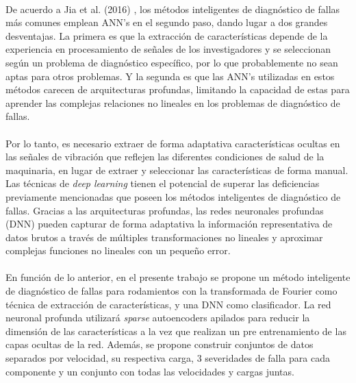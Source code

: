 \documentclass[a4paper,12pt]{article}
\begin{document}
\paragraph{}
De acuerdo a Jia et al. (2016) \cite{jia}, los métodos inteligentes de diagnóstico de fallas más comunes emplean ANN's en el segundo paso, dando lugar a dos grandes desventajas. La primera es que la extracción de características depende de la experiencia en procesamiento de señales de los investigadores y se seleccionan según un problema de diagnóstico específico, por lo que probablemente no sean aptas para otros problemas. Y la segunda es que las ANN's utilizadas en estos métodos carecen de arquitecturas profundas, limitando la capacidad de estas para aprender las complejas relaciones no lineales en los problemas de diagnóstico de fallas.

\paragraph{}
Por lo tanto, es necesario extraer de forma adaptativa características ocultas en las señales de vibración que reflejen las diferentes condiciones de salud de la maquinaria, en lugar de extraer y seleccionar las características de forma manual. Las técnicas de \textit{deep learning} tienen el potencial de superar las deficiencias previamente mencionadas que poseen los métodos inteligentes de diagnóstico de fallas. Gracias a las arquitecturas profundas, las redes neuronales profundas (DNN) pueden capturar de forma adaptativa la información representativa de datos brutos a través de múltiples transformaciones no lineales y aproximar complejas funciones no lineales con un pequeño error.

\paragraph{}
En función de lo anterior, en el presente trabajo se propone un método inteligente de diagnóstico de fallas para rodamientos con la transformada de Fourier como técnica de extracción de características, y una DNN como clasificador. La red neuronal profunda utilizará \textit{sparse} autoencoders apilados para reducir la dimensión de las características a la vez que realizan un pre entrenamiento de las capas ocultas de la red. Además, se propone construir conjuntos de datos separados por velocidad, su respectiva carga, 3 severidades de falla para cada componente y un conjunto con todas las velocidades y cargas juntas.
\end{document}

